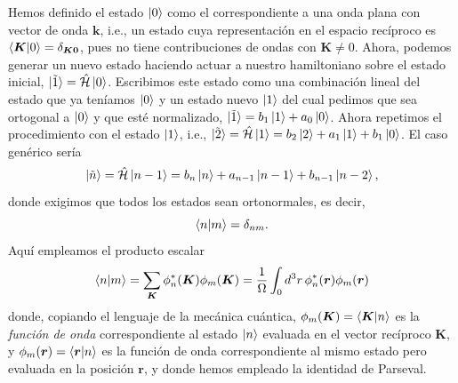\documentclass[12pt]{article}
\begin{document}
Hemos definido el estado $\ket{0}$ como el correspondiente a una onda
plana con vector de onda $\bm k$, i.e., un estado cuya representación
en el espacio recíproco es $\braket{\bm K|0}=\delta_{\bm K\bm 0}$,
pues no tiene contribuciones de ondas con $\bm K\ne0$. Ahora, podemos
generar un nuevo estado haciendo actuar a nuestro hamiltoniano sobre
el estado inicial, $\ket{\tilde 1}=\hat{\mathcal
  H}\ket{0}$. Escribimos este estado como una combinación lineal del
estado que ya teníamos $\ket{0}$ y un estado nuevo $\ket{1}$ del cual
pedimos que sea ortogonal a $\ket{0}$ y que esté normalizado,
$\ket{\tilde 1}=b_1\ket{1}+a_0\ket{0}$. Ahora repetimos el
procedimiento con el estado $\ket{1}$, i.e., $\ket{\tilde
  2}=\hat{\mathcal H}\ket{1}=b_2\ket{2}+a_1\ket{1}+b_1\ket{0}$. El
caso genérico sería
\begin{equation}
  \label{eq:tilden}
  \ket{\tilde n}=\hat{\mathcal
    H}\ket{n-1}=b_n\ket{n}+a_{n-1}\ket{n-1}+b_{n-1}\ket{n-2},
\end{equation}
donde exigimos que todos los estados sean ortonormales, es decir,
\begin{equation}
  \label{eq:n|m}
  \braket{n|m}=\delta_{nm}.
\end{equation}
Aquí empleamos el producto escalar
\begin{equation}
  \label{eq:braket}
  \braket{n|m}=\sum_{\bm K}\phi_n^*(\bm K)\phi_m(\bm K)
  =\frac{1}{\Omega}\int_0 d^3r\, \phi_n^*(\bm r)\phi_m(\bm r)
\end{equation}
donde, copiando el lenguaje de la mecánica cuántica, $\phi_m(\bm
K)=\braket{\bm K|n}$ es la {\em función de onda}
correspondiente al estado $\ket{n}$ evaluada en el vector recíproco
$\bm K$, y $\phi_m(\bm r)=\braket{\bm r|n}$ es la función de onda
correspondiente al mismo estado pero evaluada en la posición $\bm r$,
y donde hemos empleado la identidad de Parseval.
\end{document}
